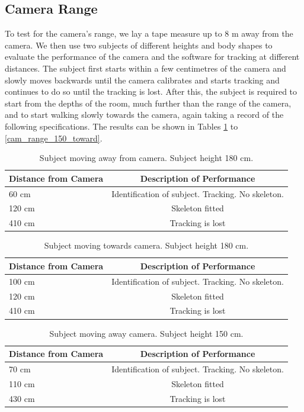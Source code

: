 \documentclass[11pt,a4paper]{article}
\begin{document}
\subsection{Camera Range}
\noindent 
To test for the camera's range, we lay a tape measure up to 8 m away from the camera. We then use two subjects of different heights and body shapes to evaluate the performance of the camera and the software for tracking at different distances. The subject first starts within a few centimetres of the camera and slowly moves backwards until the camera calibrates and starts tracking and continues to do so until the tracking is lost. After this, the subject is required to start from the depths of the room, much further than the range of the camera, and to start walking slowly towards the camera, again taking a record of the following specifications. The results can be shown in Tables \ref{cam_range_180_away} to \ref{cam_range_150_toward}.
\\
\begin{table}[H]
\center
\begin{tabular}{ | l | c |}
\hline
Distance from Camera & Description of Performance \\
\hline
60 cm & Identification of subject. Tracking. No skeleton.\\
120 cm & Skeleton fitted\\
410 cm & Tracking is lost\\
\hline
\end{tabular}
\caption{Subject moving away from camera. Subject height 180 cm.}
\label{cam_range_180_away}
\end{table}

\begin{table}[H]
\center
\begin{tabular}{ | l | c |}
\hline
Distance from Camera & Description of Performance \\
\hline
100 cm & Identification of subject. Tracking. No skeleton.\\
120 cm & Skeleton fitted\\
410 cm & Tracking is lost\\
\hline
\end{tabular}
\caption{Subject moving towards camera. Subject height 180 cm.}
\label{cam_range_180_toward}
\end{table}

\begin{table}[H]
\center
\begin{tabular}{ | l | c |}
\hline
Distance from Camera & Description of Performance \\
\hline
70 cm & Identification of subject. Tracking. No skeleton.\\
110 cm & Skeleton fitted\\
430 cm & Tracking is lost\\
\hline
\end{tabular}
\caption{Subject moving away camera. Subject height 150 cm.}
\label{cam_range_150_away}
\end{table}
\end{document}
